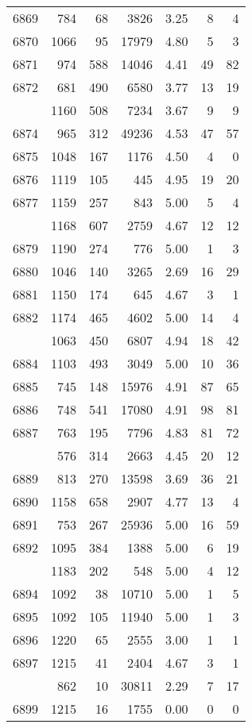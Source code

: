 \documentclass[
]{article}
\begin{document}
\begin{table}
\begin{tabular}[t]{lrrrrrr}
6869 & 784 & 68 & 3826 & 3.25 & 8 & 4\\
6870 & 1066 & 95 & 17979 & 4.80 & 5 & 3\\
6871 & 974 & 588 & 14046 & 4.41 & 49 & 82\\
6872 & 681 & 490 & 6580 & 3.77 & 13 & 19\\
\addlinespace
6873 & 1160 & 508 & 7234 & 3.67 & 9 & 9\\
6874 & 965 & 312 & 49236 & 4.53 & 47 & 57\\
6875 & 1048 & 167 & 1176 & 4.50 & 4 & 0\\
6876 & 1119 & 105 & 445 & 4.95 & 19 & 20\\
6877 & 1159 & 257 & 843 & 5.00 & 5 & 4\\
\addlinespace
6878 & 1168 & 607 & 2759 & 4.67 & 12 & 12\\
6879 & 1190 & 274 & 776 & 5.00 & 1 & 3\\
6880 & 1046 & 140 & 3265 & 2.69 & 16 & 29\\
6881 & 1150 & 174 & 645 & 4.67 & 3 & 1\\
6882 & 1174 & 465 & 4602 & 5.00 & 14 & 4\\
\addlinespace
6883 & 1063 & 450 & 6807 & 4.94 & 18 & 42\\
6884 & 1103 & 493 & 3049 & 5.00 & 10 & 36\\
6885 & 745 & 148 & 15976 & 4.91 & 87 & 65\\
6886 & 748 & 541 & 17080 & 4.91 & 98 & 81\\
6887 & 763 & 195 & 7796 & 4.83 & 81 & 72\\
\addlinespace
6888 & 576 & 314 & 2663 & 4.45 & 20 & 12\\
6889 & 813 & 270 & 13598 & 3.69 & 36 & 21\\
6890 & 1158 & 658 & 2907 & 4.77 & 13 & 4\\
6891 & 753 & 267 & 25936 & 5.00 & 16 & 59\\
6892 & 1095 & 384 & 1388 & 5.00 & 6 & 19\\
\addlinespace
6893 & 1183 & 202 & 548 & 5.00 & 4 & 12\\
6894 & 1092 & 38 & 10710 & 5.00 & 1 & 5\\
6895 & 1092 & 105 & 11940 & 5.00 & 1 & 3\\
6896 & 1220 & 65 & 2555 & 3.00 & 1 & 1\\
6897 & 1215 & 41 & 2404 & 4.67 & 3 & 1\\
\addlinespace
6898 & 862 & 10 & 30811 & 2.29 & 7 & 17\\
6899 & 1215 & 16 & 1755 & 0.00 & 0 & 0\\

\end{tabular}
\end{table}
\end{document}
